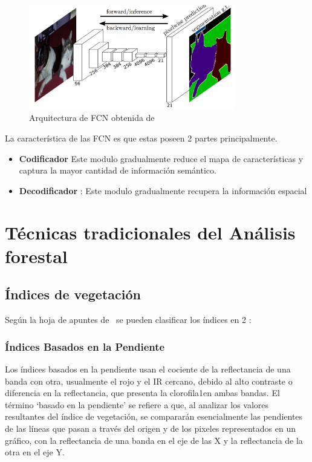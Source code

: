 \begin{figure}[H]
    \centering
    \includegraphics[width = 0.8\textwidth]{images/cat_segmentation.png}
    \caption{Arquitectura de \gls{FCN} obtenida de~\cite{long2015fully}}
    \label{fig:my_label}
\end{figure}
La característica de las \gls{FCN} es que estas poseen 2 partes principalmente.
\begin{itemize}
        \item \textbf{Codificador} Este modulo gradualmente reduce el mapa de características y captura la mayor cantidad de información semántico.
        \item \textbf{Decodificador} : Este modulo gradualmente recupera la información espacial 
    \end{itemize}{}
    
    

\section{Técnicas tradicionales del Análisis forestal}
\subsection{Índices de vegetación }
Según la hoja de apuntes de~\cite{munoz2017apuntes} se pueden clasificar los índices en 2 :
\subsubsection{Índices Basados en la Pendiente}
Los índices basados en la pendiente usan el cociente de la reflectancia de una banda con otra, usualmente el rojo y el \gls{IR} cercano, debido al alto contraste o diferencia en la reflectancia, que presenta la clorofila1en ambas bandas. El término ‘basado en la pendiente’ se refiere a que, al analizar los valores resultantes del índice de vegetación, se compararán esencialmente las pendientes de las líneas que pasan a través del origen y de los pixeles representados en un gráfico, con la reflectancia de una banda en el eje de las X y la reflectancia de la otra en el eje Y.


